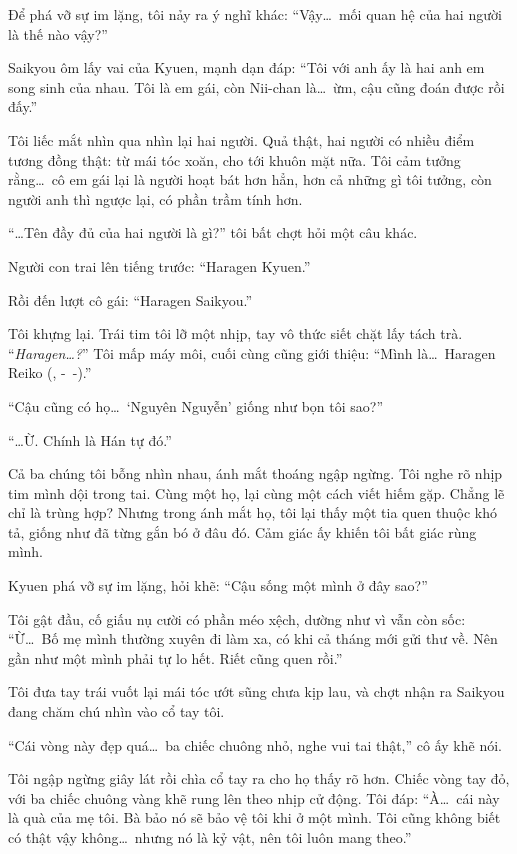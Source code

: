 \documentclass[../main.tex]{subfiles}
\begin{document}
Để phá vỡ sự im lặng, tôi nảy ra ý nghĩ khác:
``Vậy\dots\ mối quan hệ của hai người là thế nào vậy?''

Saikyou ôm lấy vai của Kyuen, mạnh dạn đáp: ``Tôi với anh ấy là hai anh em song sinh của nhau. Tôi là em gái, còn Nii-chan là\dots\ ừm, cậu cũng đoán được rồi đấy.''

Tôi liếc mắt nhìn qua nhìn lại hai người. Quả thật, hai người có nhiều điểm tương đồng thật: từ mái tóc xoăn, cho tới khuôn mặt nữa. Tôi cảm tưởng rằng\dots\ cô em gái lại là người hoạt bát hơn hẳn, hơn cả những gì tôi tưởng, còn người anh thì ngược lại, có phần trầm tính hơn.

``\dots Tên đầy đủ của hai người là gì?'' tôi bất chợt hỏi một câu khác.

Người con trai lên tiếng trước: ``Haragen Kyuen.''

Rồi đến lượt cô gái: ``Haragen Saikyou.''

Tôi khựng lại. Trái tim tôi lỡ một nhịp, tay vô thức siết chặt lấy tách trà. ``\textit{Haragen\dots?}'' Tôi mấp máy môi, cuối cùng cũng giới thiệu: ``Mình là\dots\ Haragen Reiko (, -\ -).''

``Cậu cũng có họ\dots\ `Nguyên Nguyễn' giống như bọn tôi sao?''

``\dots Ừ. Chính là Hán tự đó.''

Cả ba chúng tôi bỗng nhìn nhau, ánh mắt thoáng ngập ngừng. Tôi nghe rõ nhịp tim mình dội trong tai.  Cùng một họ, lại cùng một cách viết hiếm gặp. Chẳng lẽ chỉ là trùng hợp? Nhưng trong ánh mắt họ, tôi lại thấy một tia quen thuộc khó tả, giống như đã từng gắn bó ở đâu đó. Cảm giác ấy khiến tôi bất giác rùng mình.

Kyuen phá vỡ sự im lặng, hỏi khẽ: ``Cậu sống một mình ở đây sao?''

Tôi gật đầu, cố giấu nụ cười có phần méo xệch, dường như vì vẫn còn sốc: ``Ừ\dots\ Bố mẹ mình thường xuyên đi làm xa, có khi cả tháng mới gửi thư về. Nên gần như một mình phải tự lo hết. Riết cũng quen rồi.''

Tôi đưa tay trái vuốt lại mái tóc ướt sũng chưa kịp lau, và chợt nhận ra Saikyou đang chăm chú nhìn vào cổ tay tôi.

``Cái vòng này đẹp quá\dots\ ba chiếc chuông nhỏ, nghe vui tai thật,'' cô ấy khẽ nói.

Tôi ngập ngừng giây lát rồi chìa cổ tay ra cho họ thấy rõ hơn. Chiếc vòng tay đỏ, với ba chiếc chuông vàng khẽ rung lên theo nhịp cử động. Tôi đáp: ``À\dots\ cái này là quà của mẹ tôi. Bà bảo nó sẽ bảo vệ tôi khi ở một mình. Tôi cũng không biết có thật vậy không\dots\ nhưng nó là kỷ vật, nên tôi luôn mang theo.''
\end{document}
